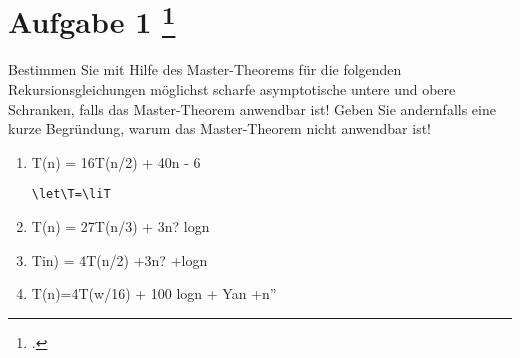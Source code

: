 \documentclass{lehramt-informatik-aufgabe}
\begin{document}
\liAufgabenTitel{}
\section{Aufgabe 1
\footcite{66115:2011:03}}

Bestimmen Sie mit Hilfe des Master-Theorems für die folgenden
Rekursionsgleichungen möglichst scharfe asymptotische untere und obere
Schranken, falls das Master-Theorem anwendbar ist! Geben Sie andernfalls
eine kurze Begründung, warum das Master-Theorem nicht anwendbar ist!

\begin{enumerate}

\item T(n) = 16T(n/2) + 40n - 6

\begin{liAntwort}
\def\liLet#1#2{
  \texttt{\textbackslash{}let\textbackslash#1=\textbackslash#2}
}
\liLet{T}{liT}
\end{liAntwort}


\item T(n) = 27T(n/3) + 3n? logn


\item Tin) = 4T(n/2) +3n? +logn


\item T(n)=4T(w/16) + 100 logn + Yan +n”
\end{enumerate}
\end{document}
